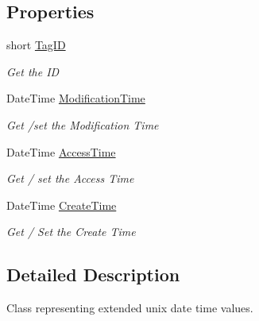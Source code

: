 \subsection*{Properties}
\begin{DoxyCompactItemize}
\item 
short \hyperlink{class_i_c_sharp_code_1_1_sharp_zip_lib_1_1_zip_1_1_extended_unix_data_a69b91f14cb2e734e4395689918887666}{Tag\+ID}
\begin{DoxyCompactList}\small\item\em Get the ID \end{DoxyCompactList}\item 
Date\+Time \hyperlink{class_i_c_sharp_code_1_1_sharp_zip_lib_1_1_zip_1_1_extended_unix_data_a2414a1301d3756dfb9f16bd9e1174e0d}{Modification\+Time}
\begin{DoxyCompactList}\small\item\em Get /set the Modification Time \end{DoxyCompactList}\item 
Date\+Time \hyperlink{class_i_c_sharp_code_1_1_sharp_zip_lib_1_1_zip_1_1_extended_unix_data_a7a9ff24638e08361f9ef2e439a97d6fd}{Access\+Time}
\begin{DoxyCompactList}\small\item\em Get / set the Access Time \end{DoxyCompactList}\item 
Date\+Time \hyperlink{class_i_c_sharp_code_1_1_sharp_zip_lib_1_1_zip_1_1_extended_unix_data_a8cc2d8c696669b4f17e1718c016c980a}{Create\+Time}
\begin{DoxyCompactList}\small\item\em Get / Set the Create Time \end{DoxyCompactList}\end{DoxyCompactItemize}


\subsection{Detailed Description}
Class representing extended unix date time values. 



